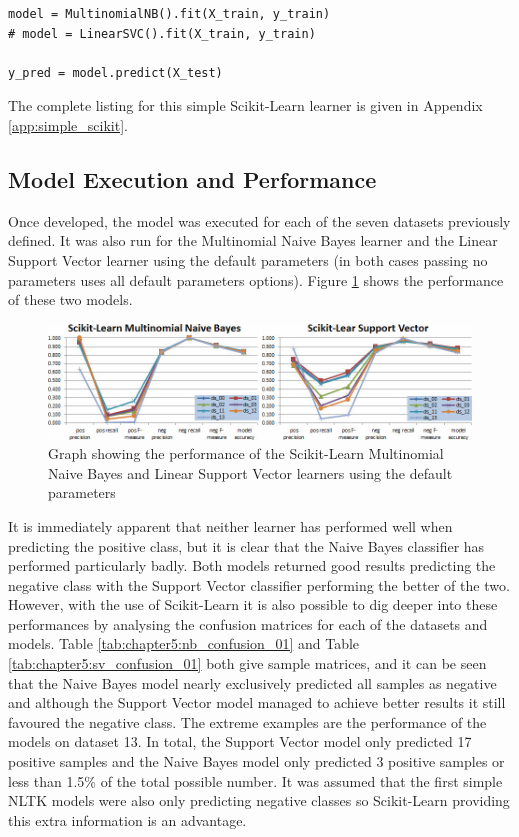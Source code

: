 \begin{lstlisting}[caption={Create TfidfVectorizer and transform training and test data}, label=lst:chapter5.3:snipet_03]
model = MultinomialNB().fit(X_train, y_train)
# model = LinearSVC().fit(X_train, y_train)

y_pred = model.predict(X_test)
\end{lstlisting}

The complete listing for this simple Scikit-Learn learner is given in Appendix \ref{app:simple_scikit}.

\subsection{Model Execution and Performance}

Once developed, the model was executed for each of the seven datasets previously defined. It was also run for the Multinomial Naive Bayes learner and the Linear Support Vector learner using the default parameters (in both cases passing no parameters uses all default parameters options). Figure \ref{fig:scikit_process_chart_01} shows the performance of these two models.

\begin{figure}[htbp]
	\centering
	\includegraphics[width=1\textwidth]{Figures/Chapter5/scikit_process_chart_01.jpg}
	\caption[Scikit-Learn model performance using default parameters]{Graph showing the performance of the Scikit-Learn Multinomial Naive Bayes and Linear Support Vector learners using the default parameters}
	\label{fig:scikit_process_chart_01}
\end{figure}
 
It is immediately apparent that neither learner has performed well when predicting the positive class, but it is clear that the Naive Bayes classifier has performed particularly badly. Both models returned good results predicting the negative class with the Support Vector classifier performing the better of the two. However, with the use of Scikit-Learn it is also possible to dig deeper into these performances by analysing the confusion matrices for each of the datasets and models. Table \ref{tab:chapter5:nb_confusion_01} and Table \ref{tab:chapter5:sv_confusion_01} both give sample matrices, and it can be seen that the Naive Bayes model nearly exclusively predicted all samples as negative and although the Support Vector model managed to achieve better results it still favoured the negative class. The extreme examples are the performance of the models on dataset 13. In total, the Support Vector model only predicted 17 positive samples and the Naive Bayes model only predicted 3 positive samples or less than 1.5\% of the total possible number. It was assumed that the first simple NLTK models were also only predicting negative classes so Scikit-Learn providing this extra information is an advantage.

